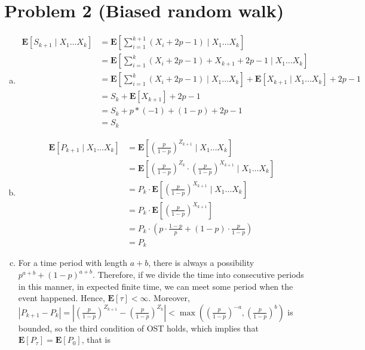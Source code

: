 \documentclass{article}
\theoremstyle{definition}
\begin{document}
	\section*{Problem 2 (Biased random walk)}
	\begin{enumerate}[(a)]
		\item  
		\begin{equation}
			\begin{aligned}
				\mathbf E [S_{k+1}\mid X_1\dots X_k] & = \mathbf E [\sum_{i=1}^{k+1}(X_i+2p-1)\mid X_1\dots X_k] \\
				& = \mathbf E [\sum_{i=1}^{k}(X_i+2p-1)+X_{k+1}+2p-1\mid X_1\dots X_k] \\ 
				& = \mathbf E [\sum_{i=1}^{k}(X_i+2p-1)\mid X_1\dots X_k]+\mathbf E [X_{k+1}\mid X_1\dots X_k]+2p-1 \\
				& = S_k+\mathbf E [X_{k+1}]+2p-1 \\
				& = S_k+p*(-1)+(1-p)+2p-1 \\
				& = S_k
			\end{aligned}
		\end{equation}
		\item 
		\begin{equation}
			\begin{aligned}
				\mathbf E [P_{k+1}\mid X_1\dots X_k] & = \mathbf E [(\frac{p}{1-p})^{Z_{k+1}}\mid X_1\dots X_k] \\
				& = \mathbf E [(\frac{p}{1-p})^{Z_{k}}\cdot(\frac{p}{1-p})^{X_{k+1}}\mid X_1\dots X_k] \\ 
				& = P_k\cdot\mathbf E [(\frac{p}{1-p})^{X_{k+1}}\mid X_1\dots X_k] \\ 
				& = P_k\cdot\mathbf E [(\frac{p}{1-p})^{X_{k+1}}] \\ 
				& = P_k\cdot\left(p\cdot\frac{1-p}{p}+(1-p)\cdot\frac{p}{1-p}\right) \\
				& = P_k
			\end{aligned}
		\end{equation}
		\item For a time period with length $a+b$, there is always a possibility $p^{a+b}+(1-p)^{a+b}$. Therefore, if we divide the time into consecutive
		periods in this manner, in expected finite time, we can meet some period
		when the event happened. Hence, $\mathbf E [\tau] < \infty$. Moreover, $|P_{k+1}-P_k| = |(\frac{p}{1-p})^{Z_{k+1}}-(\frac{p}{1-p})^{Z_{k}}|<\max{((\frac{p}{1-p})^{-a}, (\frac{p}{1-p})^{b})}$ is bounded, so the third condition of OST
		holds, which implies that $\mathbf E [P_\tau] = \mathbf E [P_0]$, that is
		\begin{equation}

\end{equation}
\end{enumerate}
\end{document}
